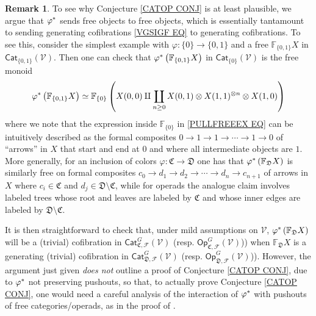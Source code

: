 \documentclass[a4paper,10pt
 ,final
]{article}%
\numberwithin{equation}{section}
\numberwithin{figure}{section}
\theoremstyle{definition} %
\newtheorem{remark}[equation]{Remark}%
\newcommand{\F}{\ensuremath{\mathcal F}}
\newcommand{\V}{\ensuremath{\mathcal V}}
\newcommand{\1}{\ensuremath{\mathbbm 1}}%
\begin{document}
\begin{remark}
To see why Conjecture \ref{CATOP CONJ} is at least plausible,
we argue that $\varphi^{\**}$ sends free objects to free objects, 
which is essentially tantamount to
sending generating cofibrations \eqref{VGSIGF EQ} to generating cofibrations.
%
To see this, consider the simplest example 
with
$\varphi \colon \{0\} \to \{0,1\}$
and a free $\mathbb{F}_{\{0,1\}}X $ in $\mathsf{Cat}_{\{0,1\}}(\V)$.
Then one can check that 
$\varphi^{\**} \left( \mathbb{F}_{\{0,1\}}X \right)$ in $\mathsf{Cat}_{\{0\}}(\V)$ is the free monoid
\begin{equation}\label{PULLFREEEX EQ}
	\varphi^{\**} \left( \mathbb{F}_{\{0,1\}}X \right)
\simeq
	\mathbb{F}_{\{0\}}
	\left(X(0,0) \amalg 
	\coprod_{n \geq 0}
	X(0,1)\otimes X(1,1)^{\otimes n} \otimes X(1,0) 
	\right)
\end{equation}
where we note that the expression inside
$\mathbb{F}_{\{0\}}$
in \eqref{PULLFREEEX EQ}
can be intuitively described as the formal composites
$0 \to 1 \to 1 \to \cdots \to 1 \to 0$
of ``arrows'' in $X$ that start and end at $0$ and where all intermediate objects are $1$.
%
More generally, for an inclusion of colors 
$\varphi \colon \mathfrak{C} \to \mathfrak{D}$
one has that 
$\varphi^{\**} \left(\mathbb{F}_{\mathfrak{D}} X\right)$
is similarly free on formal composites
$c_0 \to d_1 \to d_2 \to \cdots \to d_n \to c_{n+1}$
of arrows in $X$
where $c_i \in \mathfrak{C}$
and $d_j \in \mathfrak{D} \setminus \mathfrak{C}$,
while for operads the analogue claim involves labeled trees whose root and leaves are labeled by $\mathfrak{C}$
and whose inner edges are labeled by 
$\mathfrak{D} \setminus \mathfrak{C}$.
 
It is then straightforward to check that, under mild assumptions on $\V$,
$\varphi^{\**} \left(\mathbb{F}_{\mathfrak{D}} X \right)$
will be a (trivial) cofibration in 
$\mathsf{Cat}^G_{\mathfrak{C},\F}(\V)$
(resp. $\mathsf{Op}^G_{\mathfrak{C},\F}(\V)$))
when $\mathbb{F}_{\mathfrak{D}} X$
is a generating (trivial) cofibration
in $\mathsf{Cat}^G_{\mathfrak{D},\F}(\V)$
(resp. $\mathsf{Op}^G_{\mathfrak{D},\F}(\V)$)).
However, the argument just given \emph{does not} outline a proof of Conjecture \ref{CATOP CONJ},
due to $\varphi^{\**}$ not preserving pushouts, 
so that, to actually prove Conjecture \ref{CATOP CONJ},
one would need a careful analysis of the interaction of $\varphi^{\**}$ with pushouts of free categories/operads, 
as in the proof of \cite[Thm. 1.15]{BM13}.


\end{remark}
\end{document}
